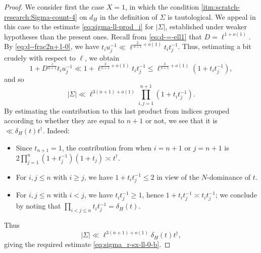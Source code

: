 \begin{proof}
  We consider first the case $X = 1$, in which the condition \eqref{itm:scratch-research:Sigma-count-4} on $d_H$ in the definition of $\Sigma$ is tautological.  We appeal in this case to the estimate \eqref{eq:sigma-ll-prod_i} for $|\Sigma|$, established under weaker hypotheses than the present ones.  Recall from \eqref{eq:d-=-ell1} that $D = \ell^{1 + o(1)}$.  By \eqref{eq:d--frac2n+1-0}, we have $t_i u_j^{-1} \ll \ell^{\frac{2}{n+1} + o(1)} t_i t_j^{-1}$.  Thus, estimating a bit crudely with respect to $\ell$, we obtain
  \begin{equation*}
    1 + D^{\frac{1}{n + 1}} t_i u_j^{-1}
    \ll
    1 +
    \ell^{\frac{3}{n+1} + o(1)} t_i t_j^{-1}
    \leq
    \ell^{\frac{3}{n+1} + o(1)}(1 +
    t_i t_j^{-1}),
  \end{equation*}
  and so
  \begin{equation*}
    |\Sigma| \ll \ell^{3 (n+1) + o(1)} \prod_{i,j=1}^{n+1} (1 + t_i t_j^{-1}).
  \end{equation*}
  By estimating the contribution to this last product from indices grouped according to whether they are equal to $n+1$ or not, we see that it is $\ll \delta_H(t) t^\dagger$.  Indeed:
  \begin{itemize}
  \item Since $t_{n+1} = 1$, the contribution from when $i=n+1$ or $j=n+1$ is $2 \prod_{j=1}^{n} (1 + t_j^{-1}) (1 + t_j) \asymp t^\dagger$.
  \item For $i,j \leq n$ with $i \geq j$, we have $1 + t_i t_j^{-1} \leq 2$ in view of the $N$-dominance of $t$.
  \item For $i,j \leq n$ with $i < j$, we have $t_i t_j^{-1} \geq 1$, hence $1 + t_i t_j^{-1} \asymp t_i t_j^{-1}$; we conclude by noting that $\prod_{i < j \leq n} t_i t_j^{-1} = \delta_H(t)$.
  \end{itemize}
  Thus
  \begin{equation}\label{eq:sigma-ll-ell3}
    |\Sigma| \ll \ell^{3 (n+1) + o(1)}
    \delta_H(t) t^\dagger,
  \end{equation}
  giving the required estimate \eqref{eq:sigma_r-sx-ll-0-b}.


\end{proof}
